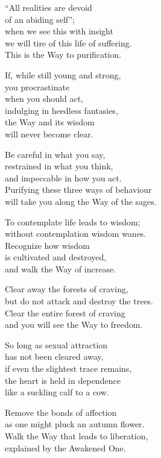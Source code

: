 “All realities are devoid\\
of an abiding self”;\\
when we see this with insight\\
we will tire of this life of suffering.\\
This is the Way to purification.


If, while still young and strong,\\
you procrastinate\\
when you should act,\\
indulging in heedless fantasies,\\
the Way and its wisdom\\
will never become clear.


Be careful in what you say,\\
restrained in what you think,\\
and impeccable in how you act.\\
Purifying these three ways of behaviour\\
will take you along the Way of the sages.


To contemplate life leads to wisdom;\\
without contemplation wisdom wanes.\\
Recognize how wisdom\\
is cultivated and destroyed,\\
and walk the Way of increase.


Clear away the forests of craving,\\
but do not attack and destroy the trees.\\
Clear the entire forest of craving\\
and you will see the Way to freedom.


So long as sexual attraction\\
has not been cleared away,\\
if even the slightest trace remains,\\
the heart is held in dependence\\
like a suckling calf to a cow.


Remove the bonds of affection\\
as one might pluck an autumn flower.\\
Walk the Way that leads to liberation,\\
explained by the Awakened One.


